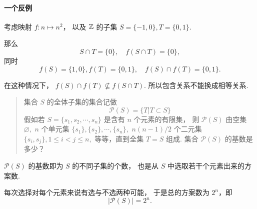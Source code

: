 \paragraph{一个反例} %
\label{par:一个反例}
考虑映射 $f: n \mapsto n^2$，
以及 $\mathbb{Z}$ 的子集 $S = \{-1, 0\}, T = \{0, 1\}$.

那么
\begin{equation}
    S \cap T = \{ 0 \}, \quad f(S \cap T) = \{ 0 \},
\end{equation}
同时
\begin{equation}
    f(S) = \{ 1, 0 \}, f(T) = \{ 0, 1 \},
    \quad f(S) \cap f(T) = \{ 0, 1 \}.
\end{equation}

在这种情况下，
$f(S) \cap f(T) \nsubseteq f(S \cap T)$.
所以包含关系不能换成相等关系.

\begin{quotation}
    集合 $S$ 的全体子集的集合记做
    \begin{equation*}
        \mathcal{P}(S) = \{ T \vert T \subset S \}
    \end{equation*}
    假如若 $S=\{s_1,s_2,\cdots,s_n\}$ 是含有 $n$ 个元素的有限集，
    则 $\mathcal{P}(S)$ 由空集 $\varnothing,$
    $n$ 个单元集 $\{s_1\}, \{s_2\}, \cdots, \{s_n\},$
    $n(n-1)/2$ 个二元集 $\{s_i, s_j\}, 1 \le i < j \le n,$
    等等，直到全集 $T = S$ 组成.
    集合 $\mathcal{P}(S)$ 的基数是多少？
\end{quotation}

$\mathcal{P}(S)$ 的基数即为 $S$ 的不同子集的个数，
也是从 $S$ 中选取若干个元素出来的方案数.

每次选择对每个元素来说有选与不选两种可能，
于是总的方案数为 $2^n$，即
\begin{equation}
    \vert \mathcal{P}(S) \vert = 2^n.
\end{equation}

